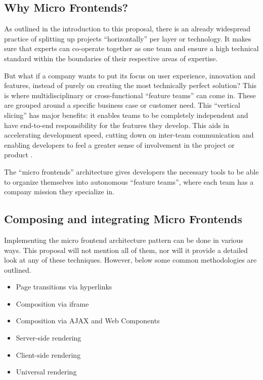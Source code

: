 \subsection{Why Micro Frontends?}
As outlined in the introduction to this proposal, there is an already widespread
practice of splitting up projects ``horizontally'' per layer or technology. It
makes sure that experts can co-operate together as one team and ensure a high
technical standard within the boundaries of their respective areas of expertise.

But what if a company wants to put its focus on user experience, innovation and
features, instead of purely on creating the most technically perfect solution?
This is where multidisciplinary or cross-functional ``feature teams'' can come
in. These are grouped around a specific business case or customer need. This
``vertical slicing'' has major benefits: it enables teams to be completely
independent and have end-to-end responsibility for the features they develop.
This aids in accelerating development speed, cutting down on inter-team
communication and enabling developers to feel a greater sense of involvement in
the project or product \autocite{LarmanVodde_2008}.

The ``micro frontends'' architecture gives developers the necessary tools to be
able to organize themselves into autonomous ``feature teams'', where each team
has a company mission they specialize in. \autocite{Geers_2020}

\subsection{Composing and integrating Micro Frontends}
Implementing the micro frontend architecture pattern can be done in various
ways. This proposal will not mention all of them, nor will it provide a detailed
look at any of these techniques. However, below some common methodologies are
outlined. \autocite{Geers_2020} \autocite{Peltonen_etal_2020}
\autocite{Pavlenko_etal_2020}

\begin{itemize}
    \item Page transitions via hyperlinks
    \item Composition via iframe
    \item Composition via AJAX and Web Components
    \item Server-side rendering
    \item Client-side rendering
    \item Universal rendering
\end{itemize}

